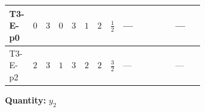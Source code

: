 \documentclass[8pt]{article}
\begin{document}
\begin{landscape}
\begin{longtable}{@{}llcccccc >{\raggedright\arraybackslash}p{0.21\linewidth} >{\raggedright\arraybackslash}p{0.21\linewidth} >{\raggedright\arraybackslash}p{0.21\linewidth}@{}}
\midrule
T3-E-p0 & $0$ & $3$ & $0$ & $3$ & $1$ & $2$ & $\frac{1}{2}$ & --- & \scriptsize\adjustbox{max width=\linewidth}{$\begin{gathered} +\frac{1}{4} (3 \left({y_1}\,\left({y_1}\right)^{\dagger}\,{y_2}\right)_{ij}+2 \left({Y_e}\,\left({Y_e}\right)^{\dagger}\,{y_2}\right)_{ij}+6 \left({y_2}\,\left({y_2}\right)^{\dagger}\,{y_2}\right)_{ij})\end{gathered}$} & --- \\
\midrule
T3-E-p2 & $2$ & $3$ & $1$ & $3$ & $2$ & $2$ & $\frac{3}{2}$ & --- & \scriptsize\adjustbox{max width=\linewidth}{$\begin{gathered} +\frac{1}{4} (3 \left({y_1}\,\left({y_1}\right)^{\dagger}\,{y_2}\right)_{ij}+2 \left({Y_e}\,\left({Y_e}\right)^{\dagger}\,{y_2}\right)_{ij}+6 \left({y_2}\,\left({y_2}\right)^{\dagger}\,{y_2}\right)_{ij})\end{gathered}$} & --- \\
\midrule
\bottomrule
\end{longtable}
\clearpage
\noindent\textbf{Quantity: }$y_2$\par\smallskip

\end{landscape}
\end{document}

